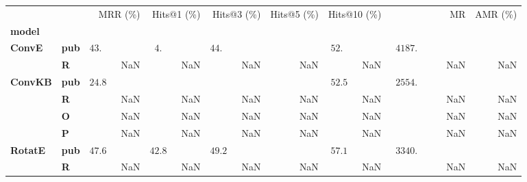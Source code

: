 \begin{tabular}{llrrrrrrr}
\toprule
       &   &                    MRR (\%) &                           Hits@1 (\%) &                 Hits@3 (\%) & Hits@5 (\%) &                Hits@10 (\%) &                                         MR & AMR (\%) \\
\textbf{model} & {} &                             &                                       &                             &             &                             &                                            &          \\
\midrule
\textbf{ConvE} & \textbf{pub} &  $43.\phantom{00 \pm 0.00}$ &  $\phantom{0}4.\phantom{00 \pm 0.00}$ &  $44.\phantom{00 \pm 0.00}$ &             &  $52.\phantom{00 \pm 0.00}$ &  $\phantom{0}4187.\phantom{00 \pm 000.00}$ &          \\
       & \textbf{R} &                         NaN &                                   NaN &                         NaN &         NaN &                         NaN &                                        NaN &      NaN \\\midrule
\textbf{ConvKB} & \textbf{pub} &  $24.8\phantom{0 \pm 0.00}$ &                                       &                             &             &  $52.5\phantom{0 \pm 0.00}$ &  $\phantom{0}2554.\phantom{00 \pm 000.00}$ &          \\
       & \textbf{R} &                         NaN &                                   NaN &                         NaN &         NaN &                         NaN &                                        NaN &      NaN \\
       & \textbf{O} &                         NaN &                                   NaN &                         NaN &         NaN &                         NaN &                                        NaN &      NaN \\
       & \textbf{P} &                         NaN &                                   NaN &                         NaN &         NaN &                         NaN &                                        NaN &      NaN \\\midrule
\textbf{RotatE} & \textbf{pub} &  $47.6\phantom{0 \pm 0.00}$ &            $42.8\phantom{0 \pm 0.00}$ &  $49.2\phantom{0 \pm 0.00}$ &             &  $57.1\phantom{0 \pm 0.00}$ &  $\phantom{0}3340.\phantom{00 \pm 000.00}$ &          \\
       & \textbf{R} &                         NaN &                                   NaN &                         NaN &         NaN &                         NaN &                                        NaN &      NaN \\
\bottomrule
\end{tabular}

